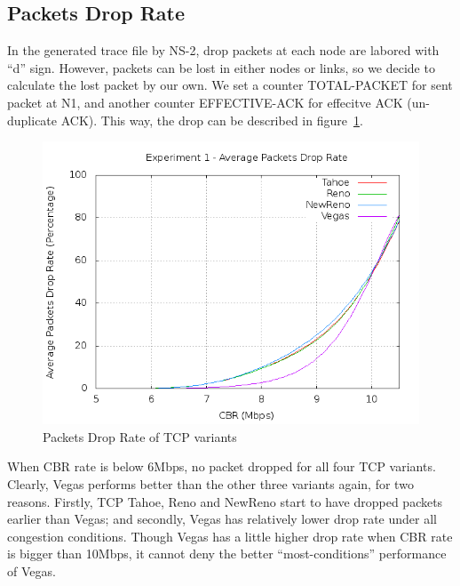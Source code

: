 \documentclass[10pt, conference]{lib/IEEEtran}
\begin{document}
\subsection{Packets Drop Rate}
In the generated trace file by NS-2, drop packets at each node are 
labored with ``d'' sign. However, packets can be lost in either nodes 
or links, so we decide to calculate the lost packet by our own. We 
set a counter TOTAL-PACKET for sent packet at N1, and another counter 
EFFECTIVE-ACK for effecitve ACK (un-duplicate ACK). This way, the drop 
can be described in figure~\ref{fig:exp1_drop}.
\begin{figure}[!htb]
    \centering
    \includegraphics[width=1.0\linewidth]{plot/exp1-dr.png}
    \caption{Packets Drop Rate of TCP variants}
    \label{fig:exp1_drop}
\end{figure}
When CBR rate is below 6Mbps, no packet dropped for all four TCP 
variants. Clearly, Vegas performs better than the other three variants 
again, for two reasons. Firstly, TCP Tahoe, Reno and NewReno start to 
have dropped packets earlier than Vegas; and secondly, Vegas has 
relatively lower drop rate under all congestion conditions. Though 
Vegas has a little higher drop rate when CBR rate is bigger than 
10Mbps, it cannot deny the better ``most-conditions'' performance of 
Vegas.
\end{document}
